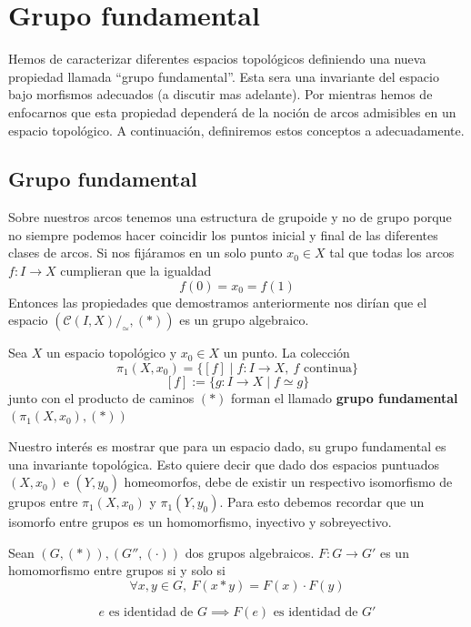 \section{Grupo fundamental}
Hemos de caracterizar diferentes espacios topológicos definiendo una
nueva propiedad llamada ``grupo fundamental''. Esta sera una invariante
del espacio bajo morfismos adecuados (a discutir mas adelante). Por
mientras hemos de enfocarnos que esta propiedad dependerá de la noción
de arcos admisibles en un espacio topológico. A continuación,
definiremos estos conceptos a adecuadamente.

{
\newcommand{\homRelAlt}{\stackrel{.}{\simeq}}



\subsection{Grupo fundamental}
Sobre nuestros arcos tenemos una estructura de grupoide y no de grupo
porque no siempre podemos hacer coincidir los puntos inicial y final de
las diferentes clases de arcos. Si nos fijáramos en un solo punto \(x_0
\in X\) tal que todas los arcos \(f : I \to X\) cumplieran que la igualdad
\[ f(0) = x_0 = f (1) \]
Entonces las propiedades que demostramos anteriormente nos dirían que el
espacio \((\mathcal C \left( I , X \right) / _\simeq , \left( *
\right))\) es un grupo algebraico.
\begin{definicion}
  Sea \(X\) un espacio topológico y \(x_0 \in X\) un punto. La colección
  \[ \pi_1 (X,x_0) = \{ [f] \mid f : I \to X,\ f \text{ continua}\}\]
  \[ [f] := \{ g : I \to X \mid f \simeq g\}\]
  junto con el producto de caminos \((*)\) forman el llamado
  \textbf{grupo fundamental} \((\pi_1(X,x_0), (*))\)
\end{definicion}

Nuestro interés es mostrar que para un espacio dado, su grupo
fundamental es una invariante topológica. Esto quiere decir que dado dos
espacios puntuados \((X,x_0)\) e \((Y,y_0)\) homeomorfos, debe de
existir un respectivo isomorfismo de grupos entre \(\pi_1(X,x_0)\) y
\(\pi_1(Y,y_0)\). Para esto debemos recordar que un isomorfo entre
grupos es un homomorfismo, inyectivo y sobreyectivo.
\begin{definicion}[Homomorfismo] \label{def:homomorfismo}
  Sean \((G,(*)), (G'', (\cdot))\) dos grupos algebraicos. \(F : G \to
  G'\) es un homomorfismo entre grupos si y solo si
  \[ \forall x,y \in G,\ F (x * y) = F(x) \cdot F(y)\]
\end{definicion}
\begin{corolario}
  \[ e \text{ es identidad de } G \implies F(e) \text { es identidad de } G' \]
\end{corolario}

}
